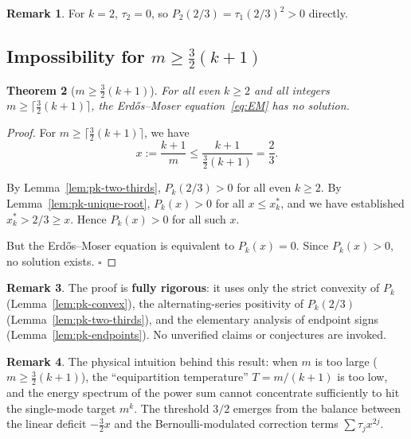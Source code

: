 \documentclass[12pt,a4paper]{article}
\theoremstyle{plain}
\newtheorem{theorem}{Theorem}[section]
\theoremstyle{definition}
\newtheorem{remark}[theorem]{Remark}
\begin{document}
\begin{remark}
  For $k = 2$, $\tau_2 = 0$, so $P_2(2/3) = \tau_1(2/3)^2 > 0$ directly.
\end{remark}

\subsection{Impossibility for $m \ge \frac{3}{2}(k+1)$}
\label{sec:largeM-proof}

\begin{theorem}[$m \ge \frac{3}{2}(k+1)$]\label{thm:even-largeM}
  For all even $k \ge 2$ and all integers $m \ge \lceil\frac{3}{2}(k+1)\rceil$,
  the Erd\H{o}s--Moser equation~\eqref{eq:EM} has no solution.
\end{theorem}

\begin{proof}
  For $m \ge \lceil\frac{3}{2}(k+1)\rceil$, we have
  \[
    x := \frac{k+1}{m} \le \frac{k+1}{\frac{3}{2}(k+1)} = \frac{2}{3}.
  \]

  By Lemma~\ref{lem:pk-two-thirds}, $P_k(2/3) > 0$ for all even $k \ge 2$.
  By Lemma~\ref{lem:pk-unique-root}, $P_k(x) > 0$ for all $x \le x^*_k$,
  and we have established $x^*_k > 2/3 \ge x$.  Hence $P_k(x) > 0$ for
  all such $x$.

  But the Erd\H{o}s--Moser equation is equivalent to $P_k(x) = 0$.
  Since $P_k(x) > 0$, no solution exists.  \hfill$\square$
\end{proof}

\begin{remark}
  The proof is \textbf{fully rigorous}: it uses only the strict convexity
  of $P_k$ (Lemma~\ref{lem:pk-convex}), the alternating-series positivity
  of $P_k(2/3)$ (Lemma~\ref{lem:pk-two-thirds}), and the elementary
  analysis of endpoint signs (Lemma~\ref{lem:pk-endpoints}).  No
  unverified claims or conjectures are invoked.
\end{remark}

\begin{remark}
  The physical intuition behind this result: when $m$ is too large
  ($m \ge \frac{3}{2}(k+1)$), the ``equipartition temperature''
  $T = m/(k+1)$ is too low, and the energy spectrum of the power sum
  cannot concentrate sufficiently to hit the single-mode target $m^k$.
  The threshold $3/2$ emerges from the balance between the linear deficit
  $-\frac{3}{2}x$ and the Bernoulli-modulated correction terms
  $\sum \tau_j x^{2j}$.
\end{remark}
\end{document}
